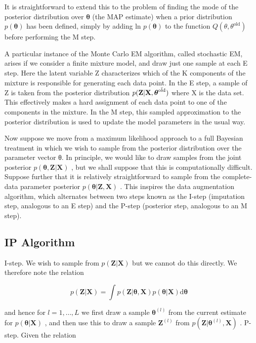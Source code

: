 \documentclass[
  10
]{article}
\begin{document}
It is straightforward to extend this to the problem of finding the mode
of the posterior distribution over \(\pmb \theta\) (the MAP estimate)
when a prior distribution \(p ( \pmb \theta )\) has been defined, simply
by adding ln \(p ( \pmb \theta )\) to the function
\(Q ( \theta , \theta ^ { \mathrm { o l d } } )\) before performing the
M step.

A particular instance of the Monte Carlo EM algorithm, called stochastic
EM, arises if we consider a finite mixture model, and draw just one
sample at each E step. Here the latent variable Z characterizes which of
the K components of the mixture is responsible for generating each data
point. In the E step, a sample of Z is taken from the posterior
distribution
\(p ( { \bf Z } | { \bf X } , \boldsymbol { \theta } ^ { \mathrm { { \bar { o l d } } } } )\)
where X is the data set. This effectively makes a hard assignment of
each data point to one of the components in the mixture. In the M step,
this sampled approximation to the posterior distribution is used to
update the model parameters in the usual way.

Now suppose we move from a maximum likelihood approach to a full
Bayesian treatment in which we wish to sample from the posterior
distribution over the parameter vector θ. In principle, we would like to
draw samples from the joint posterior
\(p ( \pmb { \theta } , \mathbf { Z } | \mathbf { X } )\) , but we shall
suppose that this is computationally difficult. Suppose further that it
is relatively straightforward to sample from the complete-data parameter
posterior \(p ( \pmb { \theta } | \mathbf { Z } , \mathbf { X } )\) .
This inspires the data augmentation algorithm, which alternates between
two steps known as the I-step (imputation step, analogous to an E step)
and the P-step (posterior step, analogous to an M step).

\subsection{IP Algorithm}\label{ip-algorithm}

I-step. We wish to sample from \(p ( \mathbf { Z } | \mathbf { X } )\)
but we cannot do this directly. We therefore note the relation

\[
p (\mathbf {Z} | \mathbf {X}) = \int p (\mathbf {Z} | \boldsymbol {\theta}, \mathbf {X}) p (\boldsymbol {\theta} | \mathbf {X}) \mathrm{d} \boldsymbol {\theta}\tag{11.30}
\]

and hence for \(l = 1 , \ldots , L\) we first draw a sample
\(\pmb \theta ^ { ( l ) }\) from the current estimate for
\(p ( \pmb \theta | \mathbf X )\) , and then use this to draw a sample
\(\mathbf { Z } ^ { ( l ) }\) from
\(p ( \mathbf { Z } | \pmb { \theta } ^ { ( l ) } , \mathbf { X } )\) .
P-step. Given the relation
\end{document}
